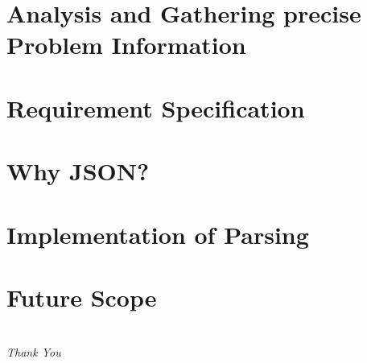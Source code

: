 \documentclass{beamer}
\begin{document}
\section{Analysis and Gathering precise Problem Information}


\section{Requirement Specification}


\section{Why JSON?}


\section{Implementation of Parsing}


\section{Future Scope}




% 





%
\section*{}
\begin{frame}{}
	\centering \Huge
	\emph{Thank You}
\end{frame}
\end{document}
